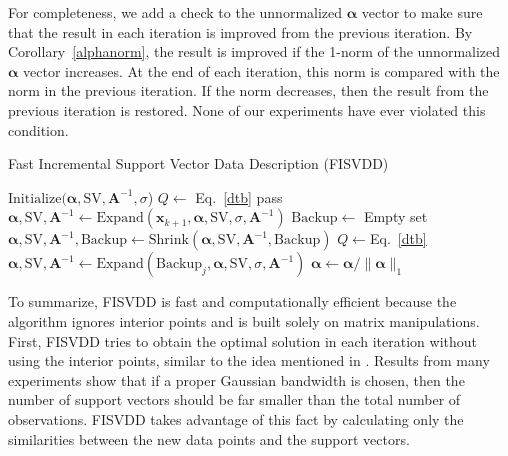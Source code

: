\documentclass{article}
\newcommand{\eref}[1]{Eq.~\ref{#1}}
\newcommand{\cref}[1]{Corollary~\ref{#1}}
\numberwithin{equation}{section}
\begin{document}
For completeness, we add a check to the unnormalized $\boldsymbol{\alpha}$ vector to make sure that the result in each iteration is improved from the previous iteration. By \cref{alphanorm}, the result is improved if the 1-norm of the unnormalized $\boldsymbol{\alpha}$ vector increases. At the end of each iteration, this norm is compared with the norm in the previous iteration. If the norm decreases, then the result from the previous iteration is restored. None of our experiments have ever violated this condition.



\begin{algorithm}
\caption{Fast Incremental Support Vector Data Description (FISVDD)}\label{fisvddalg}
\begin{algorithmic}[1]
 {$\mathrm{Initialize}(\boldsymbol{\alpha},\mathrm{SV},\mathbf{A}^{-1},\sigma$)}
\STATE $Q\gets$ \eref{dtb}
        \STATE pass
\ELSE
        \STATE $\boldsymbol{\alpha},\mathrm{SV},\mathbf{A}^{-1}\gets\mathrm{Expand}(\mathbf{x}_{k+1},\boldsymbol{\alpha},\mathrm{SV},\sigma,\mathbf{A}^{-1})$
                \STATE $\mathrm{Backup}\gets$ Empty set
                \STATE $\boldsymbol{\alpha},\mathrm{SV}, \mathbf{A}^{-1},\mathrm{Backup}\gets\mathrm{Shrink}(\boldsymbol{\alpha},\mathrm{SV},\mathbf{A}^{-1},\mathrm{Backup})$
                                \STATE $Q\gets$\eref{dtb}
                                        \STATE $\boldsymbol{\alpha},\mathrm{SV},\mathbf{A}^{-1}\gets\mathrm{Expand}(\mathrm{Backup}_j,\boldsymbol{\alpha},\mathrm{SV},\sigma,\mathbf{A}^{-1})$
                                \ENDIF
                        \ENDFOR
                \ENDIF
        \ENDIF
\STATE $\boldsymbol{\alpha}\gets\boldsymbol{\alpha}/\|\boldsymbol{\alpha}\|_1$
\ENDIF
\ENDFOR
\end{algorithmic}
\end{algorithm}






To summarize, FISVDD is fast and computationally efficient because the algorithm ignores interior points and is built solely on matrix manipulations. First, FISVDD tries to obtain the optimal solution in each iteration without using the interior points, similar to the idea mentioned in \citet{syed1999incremental}. Results from many experiments show that if a proper Gaussian bandwidth is chosen, then the number of support vectors should be far smaller than the total number of observations. FISVDD takes advantage of this fact by calculating only the similarities between the new data points and the support vectors.
\end{document}
